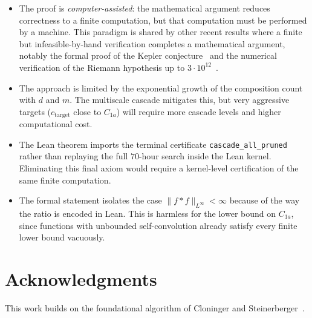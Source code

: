 \documentclass[11pt, letterpaper]{article}
\theoremstyle{paperplain}
\theoremstyle{paperdef}
\begin{document}
\begin{itemize}
  \item The proof is \emph{computer-assisted}: the mathematical
    argument reduces correctness to a finite computation, but that
    computation must be performed by a machine.  This paradigm is shared
    by other recent results where a finite but infeasible-by-hand
    verification completes a mathematical argument, notably the formal
    proof of the Kepler conjecture~\cite{Hales2017} and the numerical
    verification of the Riemann hypothesis up to
    $3\cdot 10^{12}$~\cite{PlattTrudgian2021}.

  \item The approach is limited by the exponential growth of the
    composition count with $d$ and $m$.  The multiscale cascade
    mitigates this, but very aggressive targets
    ($c_{\mathrm{target}}$ close to $C_{1a}$) will require more
    cascade levels and higher computational cost.

  \item The Lean theorem imports the terminal certificate
    \texttt{cascade\_all\_pruned} rather than replaying the full
    $70$-hour search inside the Lean kernel.  Eliminating this final
    axiom would require a kernel-level certification of the same finite
    computation.

  \item The formal statement isolates the case
    $\|f*f\|_{L^\infty} < \infty$ because of the way the ratio is
    encoded in Lean.  This is harmless for the lower bound on
    $C_{1a}$, since functions with unbounded self-convolution already
    satisfy every finite lower bound vacuously.
\end{itemize}


\section*{Acknowledgments}

This work builds on the foundational algorithm of Cloninger and
Steinerberger~\cite{CS17}.





\end{document}
